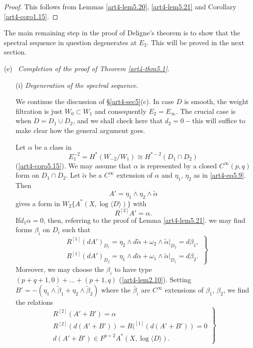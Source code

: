 \begin{proof}
This follows from Lemmas \ref{art4-lem5.20}, \ref{art4-lem5.21} and Corollary \ref{art4-coro1.15}.
\end{proof}

The main remaining step in the proof of Deligne's theorem is to show that the spectral sequence in question degenerates at $E_2$. This will be proved in the next section.

\medskip
\noindent
(e)~ \textit{Completion of the proof of Theorem \ref{art4-thm5.1}.}     

\begin{enumerate}
\item[(i)] \textit{Degeneration of the spectral sequence.}

We continue the discussion of \S \ref{art4-sec5}(c). In case $D$ is smooth, the weight filtration is just $W_0 \subset W_1$ and consequently $E_2 = E_\infty$. The crucial case is when $D= D_1 \cup D_2$, and we shall check here that $d_2 = 0 -$this will suffice to make clear how the general argument goes.

Let $\alpha$ be a class in 
$$
E^{-2}_1 = H^\ast (W_{-2}/ W_1) \cong H^{\ast-2} (D_1 \cap D_2)
$$ 
(\cf \ref{art4-coro5.15}). We may assume that $\alpha$ is represented by a closed $C^\infty(p,q)$ form on $D_1 \cap D_2$. Let $\tilde{\alpha}$ be a $C^\infty$ extension of $\alpha$ and $\eta_1$, $\eta_2$ as in \eqref{art4-eq5.9}. Then
$$
A' = \eta_1 \wedge \eta_2 \wedge \tilde{\alpha}
$$
gives a form in $W_2 \{A^\ast (X, \log \langle D \rangle ) \}$ with 
$$
R^{[2]} A' = \alpha.
$$
If\pageoriginale  $d_1 \alpha = 0$, then, referring to the proof of Lemma \eqref{art4-lem5.21}. we may find forms $\beta_i$ on $D_i$ such that
\begin{equation}
\left.
\begin{aligned}
& R^{[1]} (dA')_{D_1} = \eta_2 \wedge d \tilde{\alpha} + \omega_2 \wedge \tilde{\alpha}|_{D_2} = d \beta_1,\\
& R^{[1]} (dA')_{D_2}  =\eta_1 \wedge d\tilde{\alpha} + \omega_1 \wedge \tilde{\alpha}|_{D_1} = d \beta_2.
\end{aligned}
 \right\}
\label{art4-eq5.23}
\end{equation}
Moreover, we may choose the $\beta_i$ to have type $(p+q+1,0) + \ldots + (p +1,q)$  (\cf \eqref{art4-lem2.10}). Setting $B' = - (\eta_1 \wedge \tilde{\beta}_1 + \eta_2 \wedge \tilde{\beta}_2)$  where the $\tilde{\beta_i}$ are $C^{\infty}$ extensions of $\beta_1$, $\beta_2$, we find the relations
\begin{equation}
\left.
\begin{array}{c}
R^{[2]} (A' + B') =\alpha\\
R^{[2]} (d (A'+B')) = R(^{[1]} (d (A'+B')) =0\\
d(A'+B') \in F^{p+2} A^\ast (X, \log \langle D \rangle).
\end{array}
\right\} \label{art4-eq5.24}
\end{equation}


\end{enumerate}
